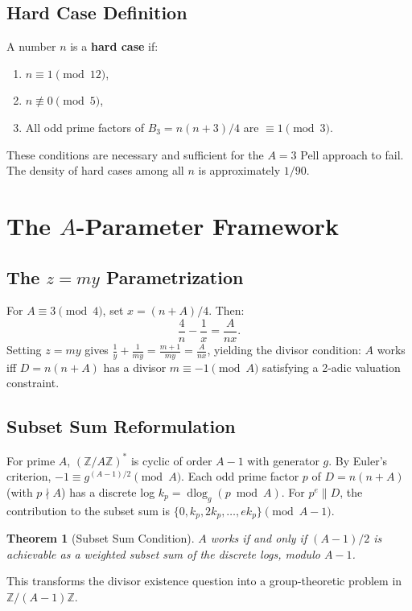 \documentclass[11pt]{article}
\newtheorem{theorem}{Theorem}
\theoremstyle{remark}
\newcommand{\Z}{\mathbb{Z}}
\newcommand{\dlog}{\operatorname{dlog}}
\begin{document}
\subsection{Hard Case Definition}

A number $n$ is a \textbf{hard case} if:
\begin{enumerate}
\item $n \equiv 1 \pmod{12}$,
\item $n \not\equiv 0 \pmod{5}$,
\item All odd prime factors of $B_3 = n(n+3)/4$ are $\equiv 1 \pmod{3}$.
\end{enumerate}
These conditions are necessary and sufficient for the $A=3$ Pell approach to fail. The density of hard cases among all $n$ is approximately $1/90$.

\section{The $A$-Parameter Framework}

\subsection{The $z=my$ Parametrization}

For $A \equiv 3 \pmod{4}$, set $x = (n+A)/4$. Then:
\[
\frac{4}{n} - \frac{1}{x} = \frac{A}{nx}.
\]
Setting $z = my$ gives $\frac{1}{y} + \frac{1}{my} = \frac{m+1}{my} = \frac{A}{nx}$, yielding the divisor condition: $A$ works iff $D = n(n+A)$ has a divisor $m \equiv -1 \pmod{A}$ satisfying a 2-adic valuation constraint.

\subsection{Subset Sum Reformulation}

For prime $A$, $(\Z/A\Z)^*$ is cyclic of order $A-1$ with generator $g$. By Euler's criterion, $-1 \equiv g^{(A-1)/2} \pmod{A}$. Each odd prime factor $p$ of $D = n(n+A)$ (with $p \nmid A$) has a discrete log $k_p = \dlog_g(p \bmod A)$. For $p^e \| D$, the contribution to the subset sum is $\{0, k_p, 2k_p, \ldots, ek_p\} \pmod{A-1}$.

\begin{theorem}[Subset Sum Condition]
$A$ works if and only if $(A-1)/2$ is achievable as a weighted subset sum of the discrete logs, modulo $A-1$.
\end{theorem}

This transforms the divisor existence question into a group-theoretic problem in $\Z/(A-1)\Z$.
\end{document}
